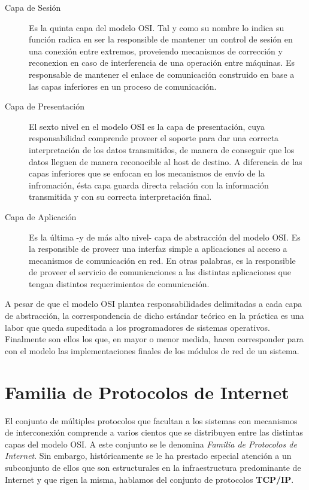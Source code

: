 \begin{description}
\item[Capa de Sesión] Es la quinta capa del modelo OSI. Tal y como su nombre lo indica su función radica en ser la responsible de mantener un control de sesión en una conexión entre extremos, proveiendo mecanismos de corrección y reconexion en caso de interferencia de una operación entre máquinas. Es responsable de mantener el enlace de comunicación construido en base a las capas inferiores en un proceso de comunicación.

\item[Capa de Presentación] El sexto nivel en el modelo OSI es la capa de presentación, cuya responsabilidad comprende proveer el soporte para dar una correcta interpretación de los datos transmitidos, de manera de conseguir que los datos lleguen de manera reconocible al host de destino. A diferencia de las capas inferiores que se enfocan en los mecanismos de envío de la infromación, ésta capa guarda directa relación con la información transmitida y con su correcta interpretación final.

\item[Capa de Aplicación] Es la última -y de más alto nivel- capa de abstracción del modelo OSI. Es la responsible de proveer una interfaz simple a aplicaciones al acceso a mecanismos de comunicación en red. En otras palabras, es la responsible de proveer el servicio de comunicaciones a las distintas aplicaciones que tengan distintos requerimientos de comunicación.

\end{description}

A pesar de que el modelo OSI plantea responsabilidades delimitadas a cada capa de abstracción, la correspondencia de dicho estándar teórico en la práctica es una labor que queda supeditada a los programadores de sistemas operativos. Finalmente son ellos los que, en mayor o menor medida, hacen corresponder para con el modelo las implementaciones finales de los módulos de red de un sistema.


\section{Familia de Protocolos de Internet}
El conjunto de múltiples protocolos que facultan a los sistemas con mecanismos de interconexión comprende a varios cientos que se distribuyen entre las distintas capas del modelo OSI. A este conjunto se le denomina \emph{Familia de Protocolos de Internet}. Sin embargo, históricamente se le ha prestado especial atención a un subconjunto de ellos que son estructurales en la infraestructura predominante de Internet y que rigen la misma, hablamos del conjunto de protocolos \textbf{TCP/IP}.

